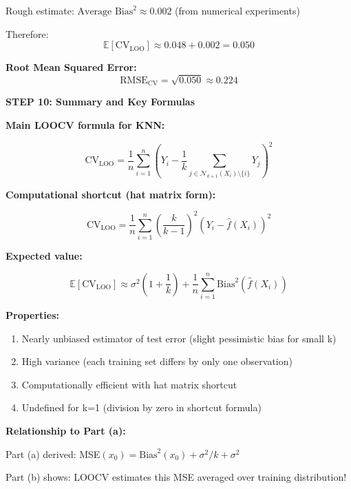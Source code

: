 \documentclass[12pt]{article}
\begin{document}
\begin{solution}
Rough estimate: $\text{Average Bias}^2 \approx 0.002$ (from numerical experiments)

Therefore:
\[
\mathbb{E}[\text{CV}_{\text{LOO}}] \approx 0.048 + 0.002 = 0.050
\]

\textbf{Root Mean Squared Error:}
\[
\text{RMSE}_{\text{CV}} = \sqrt{0.050} \approx 0.224
\]

\textbf{STEP 10: Summary and Key Formulas}

\textbf{Main LOOCV formula for KNN:}

\[
\boxed{
\text{CV}_{\text{LOO}} = \frac{1}{n}\sum_{i=1}^n \left(Y_i - \frac{1}{k}\sum_{j \in \mathcal{N}_{k+1}(X_i) \setminus \{i\}} Y_j\right)^2
}
\]

\textbf{Computational shortcut (hat matrix form):}

\[
\boxed{
\text{CV}_{\text{LOO}} = \frac{1}{n}\sum_{i=1}^n \left(\frac{k}{k-1}\right)^2(Y_i - \hat{f}(X_i))^2
}
\]

\textbf{Expected value:}

\[
\boxed{
\mathbb{E}[\text{CV}_{\text{LOO}}] \approx \sigma^2\left(1 + \frac{1}{k}\right) + \frac{1}{n}\sum_{i=1}^n \text{Bias}^2(\hat{f}(X_i))
}
\]

\textbf{Properties:}
\begin{enumerate}
    \item Nearly unbiased estimator of test error (slight pessimistic bias for small k)
    \item High variance (each training set differs by only one observation)
    \item Computationally efficient with hat matrix shortcut
    \item Undefined for k=1 (division by zero in shortcut formula)
\end{enumerate}

\textbf{Relationship to Part (a):}

Part (a) derived: MSE$(x_0) = \text{Bias}^2(x_0) + \sigma^2/k + \sigma^2$

Part (b) shows: LOOCV estimates this MSE averaged over training distribution!
\end{solution}
\end{document}
